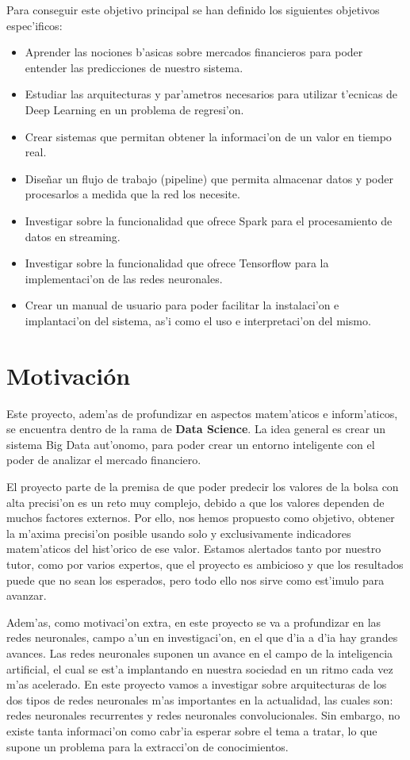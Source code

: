 Para conseguir este objetivo principal se han definido los siguientes objetivos espec'ificos:
\begin{itemize}
\item Aprender las nociones b'asicas sobre mercados financieros para poder entender las predicciones de nuestro sistema. 
\item Estudiar las arquitecturas y par'ametros necesarios para utilizar t'ecnicas de Deep Learning en un problema de regresi'on. 
\item Crear sistemas que permitan obtener la informaci'on de un valor en tiempo real.
\item Diseñar un flujo de trabajo (pipeline) que permita almacenar datos y poder procesarlos a medida que la red los necesite.
\item Investigar sobre la funcionalidad que ofrece Spark para el procesamiento de datos en streaming. 
\item Investigar sobre la funcionalidad que ofrece Tensorflow para la implementaci'on de las redes neuronales.
\item Crear un manual de usuario para poder facilitar la instalaci'on e implantaci'on del sistema, as'i como el uso e interpretaci'on del mismo.
\end{itemize}


\section{Motivación}\label{sec:motivacion}

Este proyecto, adem'as de profundizar en aspectos matem'aticos e inform'aticos, se encuentra dentro de la rama de \textbf{Data Science}. La idea general es crear un sistema Big Data aut'onomo, para poder crear un entorno inteligente con el poder de analizar el mercado financiero. 

El proyecto parte de la premisa de que poder predecir los valores de la bolsa con alta precisi'on es un reto muy complejo, debido a que los valores dependen de muchos factores externos. Por ello, nos hemos propuesto como objetivo, obtener la m'axima precisi'on posible usando solo y exclusivamente indicadores matem'aticos del hist'orico de ese valor. Estamos alertados tanto por nuestro tutor, como por varios expertos, que el proyecto es ambicioso y que los resultados puede que no sean los esperados, pero todo ello nos sirve como est'imulo para avanzar.

Adem'as, como motivaci'on extra, en este proyecto se va a profundizar en las redes neuronales, campo a'un en investigaci'on, en el que d'ia a d'ia hay grandes avances. Las redes neuronales suponen un avance en el campo de la inteligencia artificial, el cual se est'a implantando en nuestra sociedad en un ritmo cada vez m'as acelerado. En este proyecto vamos a investigar sobre arquitecturas de los dos tipos de redes neuronales m'as importantes en la actualidad, las cuales son: redes neuronales recurrentes y redes neuronales convolucionales. Sin embargo, no existe tanta informaci'on como cabr'ia  esperar sobre el tema a tratar, lo que supone un problema para la extracci'on de conocimientos.
 
